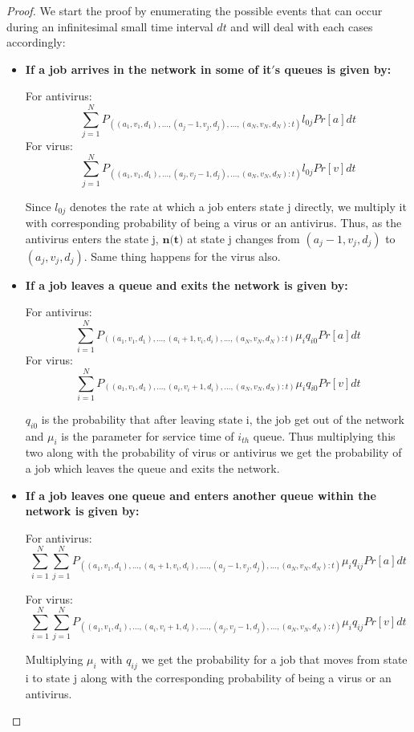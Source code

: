 \begin{proof}
We start the proof by enumerating the possible events that can occur during an infinitesimal small time interval $dt$ and will deal with each cases accordingly:

\begin{itemize}
\item \textbf{ If a job arrives in the network in some of it$'$s queues is given by: }

For antivirus: $$\sum_{j=1}^{N}P_{((a_1,v_1,d_1),...,(a_{j}-1,v_j,d_j),...,(a_N,v_N,d_N):t)}l_{0j}Pr[a]dt$$ 
For virus: $$\sum_{j=1}^{N}P_{((a_1,v_1,d_1),...,(a_j,v_{j}-1,d_j),...,(a_N,v_N,d_N):t)}l_{0j}Pr[v]dt$$

Since $l_{0j}$ denotes the rate at which a job enters state j directly, we multiply it with corresponding probability of being a virus or an antivirus. Thus, as the antivirus enters the state j, $\textbf{n(t)}$ at state j changes from $(a_{j}-1,v_j,d_j)$ to $(a_j,v_j,d_j)$. Same thing happens for the virus also.

\item \textbf{If a job leaves a queue and exits the network is given by:}

For antivirus: $$\sum_{i=1}^{N}P_{((a_1,v_1,d_1),...,(a_{i}+1,v_i,d_i),...,(a_N,v_N,d_N):t)}\mu_{i}q_{i0}Pr[a]dt$$ 
For virus: $$\sum_{i=1}^{N}P_{((a_1,v_1,d_1),...,(a_i,v_{i}+1,d_i),...,(a_N,v_N,d_N):t)}\mu_{i}q_{i0}Pr[v]dt$$

$q_{i0}$ is the probability that after leaving state i, the job get out of the network and $\mu_i$ is the parameter for service time of $i_{th}$ queue. Thus multiplying this two along with the probability of virus or antivirus we get the probability of a job which leaves the queue and exits the network.

\item \textbf{If a job leaves one queue and enters another queue within the network is given by:}

For antivirus: $$\sum_{i=1}^{N}\sum_{j=1}^{N}P_{((a_1,v_1,d_1),...,(a_{i}+1,v_i,d_i),....,(a_{j}-1,v_j,d_j),..., (a_N,v_N,d_N):t)}\mu_i q_{ij}Pr[a]dt$$ 

For virus:
$$\sum_{i=1}^{N}\sum_{j=1}^{N}P_{((a_1,v_1,d_1),...,(a_{i},v_{i}+1,d_i),....,(a_{j},v_{j}-1,d_j),..., (a_N,v_N,d_N):t)}\mu_i q_{ij}Pr[v]dt$$ 

Multiplying $\mu_{i}$ with $q_{ij}$ we get the probability for a job that moves from state i to state j along with the corresponding probability of being a virus or an antivirus.


\end{itemize}
\end{proof}
